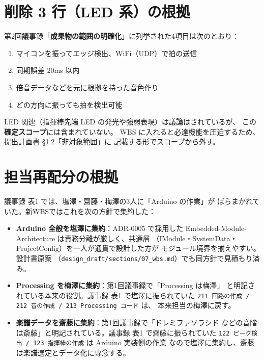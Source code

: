 \documentclass[lualatex,book,paper=a4paper,jafontsize=11pt,jafontscale=1.05]{jlreq}
\begin{document}
\section{削除 3 行（LED 系）の根拠}

\begin{tcolorbox}[colback=lightgray, colframe=noteyellow, title={\bfseries LED 系 3 タスクをスコープ外とする理由}, breakable]
第2回議事録「\textbf{成果物の範囲の明確化}」に列挙された4項目は次のとおり：

\begin{enumerate}
  \item マイコンを振ってエッジ検出、WiFi（UDP）で拍の送信
  \item 同期誤差 20ms 以内
  \item 倍音データなどを元に根拠を持った音色作り
  \item どの方向に振っても拍を検出可能
\end{enumerate}

LED 関連（指揮棒先端 LED の発光や強弱表現）は議論はされているが、
この \textbf{確定スコープ}には含まれていない。
WBS に入れると必達機能を圧迫するため、提出計画書 §1.2「非対象範囲」に
記載する形でスコープから外す。
\end{tcolorbox}

\section{担当再配分の根拠}

議事録 表1 では、塩澤・齋藤・梅澤の3人に「Arduino の作業」が
ばらまかれていた。新WBSではこれを次の方針で集約した：

\begin{itemize}
  \item \textbf{Arduino 全般を塩澤に集約}：ADR-0005 で採用した
        Embedded-Module-Architecture は責務分離が厳しく、共通層
        （IModule・SystemData・ProjectConfig）を一人が通貫で設計した方が
        モジュール境界を揃えやすい。設計書原案
        （\texttt{design\_draft/sections/07\_wbs.md}）でも同方針で見積もり済み。
  \item \textbf{Processing を梅澤に集約}：第1回議事録で「Processing は梅澤」
        と明記されている本来の役割。議事録 表1 で塩澤に振られていた
        \texttt{211 回路の作成 / 212 音の作成 / 213 Processing コード} は、
        本来担当の梅澤に戻す。
  \item \textbf{楽譜データを齋藤に集約}：第1回議事録で「ドレミファソラシド
        などの音階は斎藤」と明記されている。議事録 表1 で齋藤に振られていた
        \texttt{122 ピーク検出 / 123 指揮棒の作成} は Arduino 実装側の作業
        なので塩澤に集約し、齋藤は楽譜選定とデータ化に専念する。
\end{itemize}
\end{document}
